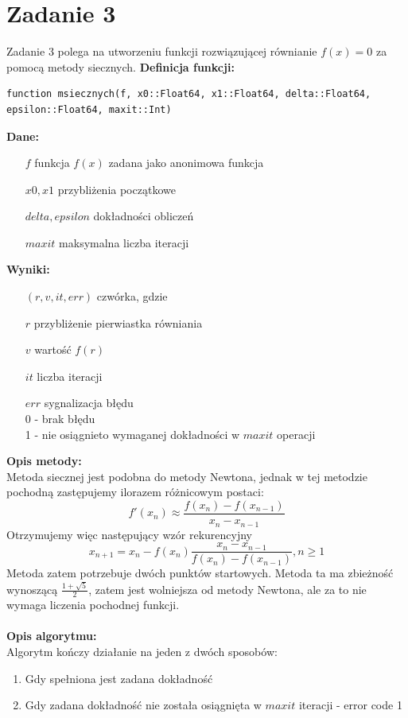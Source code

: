\documentclass[12pt]{article}
\begin{document}
\section{Zadanie 3}
Zadanie 3 polega na utworzeniu funkcji rozwiązującej równianie $f(x) = 0$ za pomocą metody siecznych. \textbf{Definicja funkcji:}
\begin{verbatim}
function msiecznych(f, x0::Float64, x1::Float64, delta::Float64, 
epsilon::Float64, maxit::Int)
\end{verbatim}
\textbf{Dane:}
\begin{itemize}[leftmargin=4.0cm,labelsep=0.4cm]
\item[$f$] funkcja $f(x)$ zadana jako anonimowa funkcja
\item[$x0, x1$] przybliżenia początkowe
\item[$delta, epsilon$] dokładności obliczeń
\item[$maxit$] maksymalna liczba iteracji
\end{itemize}
\textbf{Wyniki:} 
\begin{itemize}[leftmargin=4.0cm,labelsep=0.4cm, itemsep=0.00cm]
\item[$(r, v, it, err)$] czwórka, gdzie
\item[$r$] przybliżenie pierwiastka równiania 
\item[$v$] wartość $f(r)$
\item[$it$] liczba iteracji
\item[$err$] sygnalizacja błędu\\
0 - brak błędu\\
1 - nie osiągnieto wymaganej dokładności w $maxit$ operacji\\
\end{itemize}

\noindent \textbf{Opis metody:}\\
Metoda siecznej jest podobna do metody Newtona, jednak w tej metodzie pochodną zastępujemy ilorazem różnicowym postaci:
\begin{equation*}
f'(x_n) \approx \frac{f(x_n)-f(x_{n-1})}{x_n-x_{n-1}}
\end{equation*}
Otrzymujemy więc następujący wzór rekurencyjny
\begin{equation*}
x_{n+1} = x_n - f(x_n) \frac{x_n-x_{n-1}}{f(x_n)-f(x_{n-1})}, n \geq 1
\end{equation*}
Metoda zatem potrzebuje dwóch punktów startowych. Metoda ta ma zbieżność wynoszącą $\frac{1+\sqrt{5}}{2}$, zatem jest wolniejsza od metody Newtona, ale za to nie wymaga liczenia pochodnej funkcji.
\\
\\
\noindent \textbf{Opis algorytmu:}\\
Algorytm kończy działanie na jeden z dwóch sposobów:
\begin{enumerate}
\item Gdy spełniona jest zadana dokładność
\item Gdy zadana dokładność nie została osiągnięta w $maxit$ iteracji - error code 1
\end{enumerate}
\end{document}
